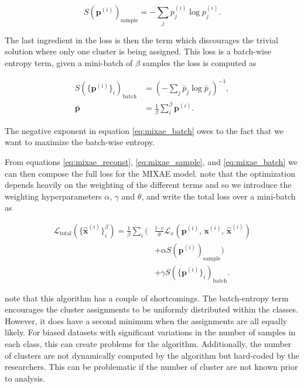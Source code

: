 \documentclass[preprint,12pt]{elsarticle}
\begin{document}
\begin{equation}\label{eq:mixae_sample}
S(\boldsymbol{p}^{(i)})_{\text{sample}} = -\sum_j p_j^{(i)} \log p_j^{(i)}. 
\end{equation}

\noindent The last ingredient in the loss is then the term which discourages the trivial solution where only one cluster is being assigned. This loss is a batch-wise entropy term, given a mini-batch of $\beta$ samples the loss is computed as 

\begin{equation}\label{eq:mixae_batch}
\begin{split}
S(\{\boldsymbol{p}^{(i)}\}_i)_{\text{batch}}&= \left(-\sum_j \bar{p}_j \log \bar{p}_j \right)^{-1},\\
\bar{\boldsymbol{p}} &= \frac{1}{\beta} \sum_i ^\beta \boldsymbol{p}^{(i)} .
\end{split}
\end{equation}

\noindent The negative exponent in equation \ref{eq:mixae_batch} owes to the fact that we want to maximize the batch-wise entropy.

From equations \ref{eq:mixae_reconst}, \ref{eq:mixae_sample}, and \ref{eq:mixae_batch} we can then compose the full loss for the MIXAE model. \cite{Zhang} note that the optimization depends heavily on the weighting of the different terms and so we introduce the weighting hyperparameters $\alpha$, $\gamma$ and $\theta$, and write the total loss over a mini-batch as 

\begin{equation}\label{eq:mixae_loss}
\begin{split}
\mathcal{L}_{\text{total}}(\{\hat{\boldsymbol{x}}^{(i)}\}^\beta_i) = \frac{1}{\beta}\sum_i \Big( &\frac{t\cdot v}{\theta} \mathcal{L}_x(\boldsymbol{p}^{(i)},\,\boldsymbol{x}^{(i)},\, \hat{\boldsymbol{x}}^{(i)} ) \\
&+ \alpha S(\boldsymbol{p}^{(i)})_{\text{sample}} \Big) \\
&+\gamma S(\{\boldsymbol{p}^{(i)}\}_i)_{\text{batch}}.
\end{split}
\end{equation}

\noindent \citet{Zhang} note that this algorithm has a couple of shortcomings. The batch-entropy term encourages the cluster assignments to be uniformly distributed within the classes. However, it does have a second minimum when the assignments are all equally likely. For biased datasets with significant variations in the number of samples in each class, this can create problems for the algorithm. Additionally, the number of clusters are not dynamically computed by the algorithm but hard-coded by the researchers. This can be problematic if the number of cluster are not known prior to analysis.
\end{document}
